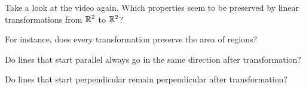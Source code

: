 





Take a look at the video again.  Which properties seem to be preserved by linear transformations
from $\mathbb R^2$ to $\mathbb R^2$?  


For instance, does every transformation preserve the area of regions? 



Do lines that start parallel always go in the same direction after transformation?  



Do lines that start perpendicular remain perpendicular after transformation? 



